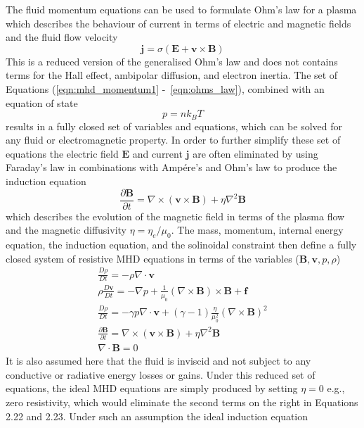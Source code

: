 The fluid momentum equations can be used to formulate Ohm's law for a plasma which describes the behaviour of current in terms of electric and magnetic fields and the fluid flow velocity
\begin{equation}
\mathbf{j} = \sigma(\mathbf{E} + \mathbf{v}\times \mathbf{B})
\label{eqn:ohms_law}
\end{equation}
This is a reduced version of the generalised Ohm's law and does not contains terms for the Hall effect, ambipolar diffusion, and electron inertia. The set of Equations (\ref{eqn:mhd_momentum1} -~\ref{eqn:ohms_law}), combined with an equation of state 
\begin{equation}
p = nk_BT
\end{equation}
results in a fully closed set of variables and equations, which can be solved for any fluid or electromagnetic property. In order to further simplify these set of equations the electric field $\mathbf{E}$ and current $\mathbf{j}$ are often eliminated by using Faraday's law in combinations with Amp\'{e}re's and Ohm's law to produce the induction equation
\begin{equation}
\frac{\partial \mathbf{B}}{\partial t} = \nabla \times(\mathbf{v}\times \mathbf{B}) + \eta\nabla^2 \mathbf{B}
\end{equation}
which describes the evolution of the magnetic field in terms of the plasma flow and the magnetic diffusivity $\eta = \eta_e/\mu_0$.  The mass, momentum, internal energy equation, the induction equation, and the solinoidal constraint then define  a fully closed system of resistive MHD equations in terms of the variables ($\mathbf{B}, \mathbf{v}, p, \rho$)
\begin{eqnarray}
\frac{D\rho}{Dt} = -\rho\nabla\cdot \mathbf{v} \\
\rho\frac{D\mathbf{v}}{Dt}=-\nabla p + \frac{1}{\mu_0}(\nabla \times \mathbf{B})\times \mathbf{B} + \mathbf{f} \\
\frac{D\rho}{Dt} = -\gamma p\nabla\cdot \mathbf{v} +(\gamma -1)\frac{\eta}{\mu_0^2} (\nabla \times \mathbf{B})^2 \\
\frac{\partial \mathbf{B}}{\partial t} = \nabla \times(\mathbf{v}\times \mathbf{B}) + \eta\nabla^2 \mathbf{B} \\
\nabla\cdot \mathbf{B} = 0
\end{eqnarray}
It is also assumed here that the fluid is inviscid and not subject to any conductive or radiative energy losses or gains. Under this reduced set of equations, the ideal MHD equations are simply produced by setting $\eta = 0$ e.g., zero resistivity, which would eliminate the second terms on the right in Equations 2.22 and 2.23. Under such an assumption the ideal induction equation
